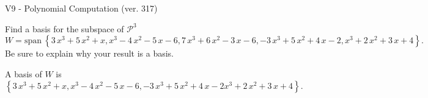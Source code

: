 \begin{exercise}
  \begin{exerciseTitle}V9 - Polynomial Computation (ver. 317)\end{exerciseTitle}
  \begin{exerciseStatement}
    Find a basis for the subspace of \(\mathcal{P}^3\) 
\[W=\mathrm{span}\ \left\{3 \, x^{3} + 5 \, x^{2} + x , x^{3} - 4 \, x^{2} - 5 \, x - 6 , 7 \, x^{3} + 6 \, x^{2} - 3 \, x - 6 , -3 \, x^{3} + 5 \, x^{2} + 4 \, x - 2 , x^{3} + 2 \, x^{2} + 3 \, x + 4\right\}.\]
 Be sure to explain why your result is a basis.


  \end{exerciseStatement}
  \begin{exerciseAnswer}
   A basis of \(W\) is  \(\left\{3 \, x^{3} + 5 \, x^{2} + x , x^{3} - 4 \, x^{2} - 5 \, x - 6 , -3 \, x^{3} + 5 \, x^{2} + 4 \, x - 2 x^{3} + 2 \, x^{2} + 3 \, x + 4\right\}\).
  


  \end{exerciseAnswer}
\end{exercise}